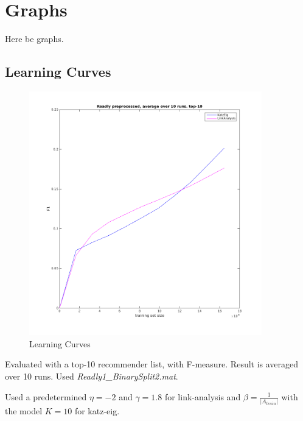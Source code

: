 \chapter{Graphs}\label{cha:graphs}

Here be graphs.

\section{Learning Curves}\label{sec:learning_curves}

\begin{figure}[h!]
  \centering
    \includegraphics[width=0.9\textwidth]{fig/readly_learning3.png}
  \caption{Learning Curves}
\end{figure}

\FloatBarrier

Evaluated with a top-10 recommender list, with F-measure. Result is averaged over 10 runs. Used \textit{Readly1\_BinarySplit2.mat}.

Used a predetermined $\eta = -2$ and $\gamma = 1.8$ for link-analysis and $\beta = \frac{1}{|A_{train}|}$ with the model $K = 10$ for katz-eig.
